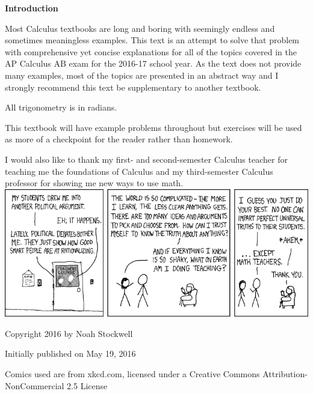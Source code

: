 \par \textbf{Introduction}
\newline
\vspace{0.125in}
\par Most Calculus textbooks are long and boring with seemingly endless and sometimes meaningless examples. This text is an attempt to solve that problem with comprehensive yet concise explanations for all of the topics covered in the AP Calculus AB exam for the 2016-17 school year. As the text does not provide many examples, most of the topics are presented in an abstract way and I strongly recommend this text be supplementary to another textbook.\\\par All trigonometry is in radians.\\\par This textbook will have example problems throughout but exercises will be used as more of a checkpoint for the reader rather than homework.\\\par I would also like to thank my first- and second-semester Calculus teacher for teaching me the foundations of Calculus and my third-semester Calculus professor for showing me new ways to use math.\\
\vfill
\includegraphics[width=\textwidth]{teachers.png}
\vfill
\par Copyright 2016 by Noah Stockwell
\par Initially published on May 19, 2016
\par Comics used are from xkcd.com, licensed under a Creative Commons Attribution-NonCommercial 2.5 License